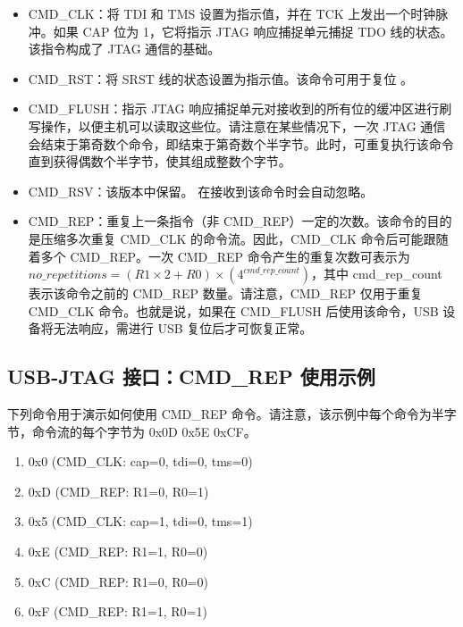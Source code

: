 \documentclass[main\_\_CN.tex]{subfiles}
\begin{document}
\begin{itemize}
\item CMD\_CLK：将 TDI 和 TMS 设置为指示值，并在 TCK 上发出一个时钟脉冲。如果 CAP 位为 1，它将指示 JTAG 响应捕捉单元捕捉 TDO 线的状态。该指令构成了 JTAG 通信的基础。

\item CMD\_RST：将 SRST 线的状态设置为指示值。该命令可用于复位 \chipname{}。

\item CMD\_FLUSH：指示 JTAG 响应捕捉单元对接收到的所有位的缓冲区进行刷写操作，以便主机可以读取这些位。请注意在某些情况下，一次 JTAG 通信会结束于第奇数个命令，即结束于第奇数个半字节。此时，可重复执行该命令直到获得偶数个半字节，使其组成整数个字节。

\item CMD\_RSV：该版本中保留。\chipname{} 在接收到该命令时会自动忽略。

\item CMD\_REP：重复上一条指令（非 CMD\_REP）一定的次数。该命令的目的是压缩多次重复 CMD\_CLK 的命令流。因此，CMD\_CLK 命令后可能跟随着多个 CMD\_REP。一次 CMD\_REP 命令产生的重复次数可表示为 \begin{math}no\_repetitions = (R1 \times 2 + R0) \times (4^{cmd\_rep\_count})\end{math}，其中 cmd\_rep\_count 表示该命令之前的 CMD\_REP 数量。请注意，CMD\_REP 仅用于重复 CMD\_CLK 命令。也就是说，如果在 CMD\_FLUSH 后使用该命令，USB 设备将无法响应，需进行 USB 复位后才可恢复正常。
\end{itemize}

\subsection{USB-JTAG 接口：CMD\_REP 使用示例}

下列命令用于演示如何使用 CMD\_REP 命令。请注意，该示例中每个命令为半字节，命令流的每个字节为 0x{}0D 0x{}5E 0x{}CF。

\begin{enumerate}
\item 0x{}0 (CMD\_CLK: cap=0, tdi=0, tms=0)
\item 0x{}D (CMD\_REP: R1=0, R0=1)
\item 0x{}5 (CMD\_CLK: cap=1, tdi=0, tms=1)
\item 0x{}E (CMD\_REP: R1=1, R0=0)
\item 0x{}C (CMD\_REP: R1=0, R0=0)
\item 0x{}F (CMD\_REP: R1=1, R0=1)
\end{enumerate}
\end{document}

